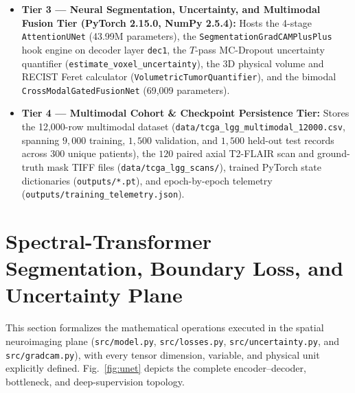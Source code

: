 \documentclass[conference]{IEEEtran}
\begin{document}
\begin{itemize}
    \item \textbf{Tier 3 --- Neural Segmentation, Uncertainty, and Multimodal Fusion Tier (PyTorch 2.15.0, NumPy 2.5.4):} Hosts the 4-stage \texttt{AttentionUNet} (43.99M parameters), the \texttt{SegmentationGradCAMPlusPlus} hook engine on decoder layer \texttt{dec1}, the $T$-pass MC-Dropout uncertainty quantifier (\texttt{estimate\_voxel\_uncertainty}), the 3D physical volume and RECIST Feret calculator (\texttt{VolumetricTumorQuantifier}), and the bimodal \texttt{CrossModalGatedFusionNet} (69,009 parameters).
    \item \textbf{Tier 4 --- Multimodal Cohort \& Checkpoint Persistence Tier:} Stores the 12,000-row multimodal dataset (\texttt{data/tcga\_lgg\_multimodal\_12000.csv}, spanning $9,000$ training, $1,500$ validation, and $1,500$ held-out test records across $300$ unique patients), the $120$ paired axial T2-FLAIR scan and ground-truth mask TIFF files (\texttt{data/tcga\_lgg\_scans/}), trained PyTorch state dictionaries (\texttt{outputs/*.pt}), and epoch-by-epoch telemetry (\texttt{outputs/training\_telemetry.json}).
\end{itemize}

\section{Spectral-Transformer Segmentation, Boundary Loss, and Uncertainty Plane}
This section formalizes the mathematical operations executed in the spatial neuroimaging plane (\texttt{src/model.py}, \texttt{src/losses.py}, \texttt{src/uncertainty.py}, and \texttt{src/gradcam.py}), with every tensor dimension, variable, and physical unit explicitly defined. Fig.~\ref{fig:unet} depicts the complete encoder--decoder, bottleneck, and deep-supervision topology.
\end{document}

